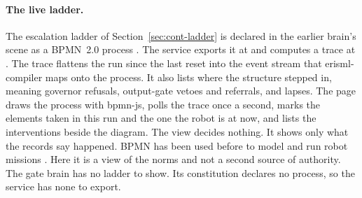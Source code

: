 \paragraph{The live ladder.} The escalation ladder of Section~\ref{sec:cont-ladder} is declared in the
earlier brain's scene as a BPMN~2.0 process \cite{omg2011bpmn}. The service exports it at
 and computes a trace at
. The trace flattens the run since the last reset into the
event stream that erisml-compiler maps onto the process. It also lists where the structure stepped
in, meaning governor refusals, output-gate vetoes and referrals, and lapses. The page
 draws the process with bpmn-js, polls the trace once a second, marks the
elements taken in this run and the one the robot is at now, and lists the interventions beside the
diagram. The view decides nothing. It shows only what the records say happened. BPMN has been used
before to model and run robot missions \cite{corradini2023bpmn}. Here it is a view of the norms and
not a second source of authority. The gate brain has no ladder to show. Its constitution
declares no process, so the service has none to export.
